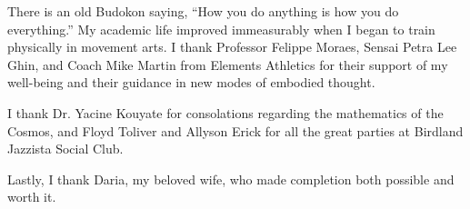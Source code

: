 \documentclass[../thesis.tex]{subfiles}
\begin{document}
 There is an old Budokon saying, ``How you do anything
 is how you do everything.''
 My academic life improved immeasurably when I began
 to train physically in movement arts.
 I thank Professor Felippe Moraes, Sensai Petra Lee Ghin,
 and Coach Mike Martin
 from Elements Athletics for
 their support of my well-being and
 their guidance in new modes of embodied thought.

 I thank Dr. Yacine Kouyate for consolations
 regarding the mathematics of the Cosmos, and Floyd Toliver
 and Allyson Erick for all the great parties at
 Birdland Jazzista Social Club.
 
 Lastly, I thank Daria, my beloved wife,
 who made completion both possible and worth it.
\end{document}

